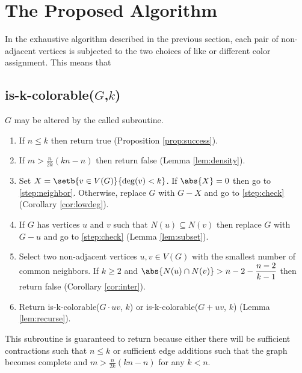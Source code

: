 \section{The Proposed Algorithm}

In the exhaustive algorithm described in the previous section, each pair of non-adjacent vertices is subjected to
the two choices of like or different color assignment.  This means that 

\subsection{is-k-colorable(\(G\),\(k\))}

\(G\) may be altered by the called subroutine.

\begin{enumerate}
\item \label{step:check} If \(n\le k\) then return true (Proposition \ref{prop:success}).

\item \label{step:density} If \(\displaystyle m>\frac{n}{2k}(kn-n)\) then return false (Lemma \ref{lem:density}).

\item \label{step:small} Set \(X=\setb{v\in V(G)}{\deg(v)<k}\).  If \(\abs{X}=0\) then go to \ref{step:neighbor}.  Otherwise,
  replace \(G\) with \(G-X\) and go to \ref{step:check} (Corollary \ref{cor:lowdeg}).

\item \label{step:neighbor} If \(G\) has vertices \(u\) and \(v\) such that \(N(u)\subseteq N(v)\) then replace \(G\) with
  \(G-u\) and go to \ref{step:check} (Lemma \ref{lem:subset}).

\item \label{step:common} Select two non-adjacent vertices \(u,v\in V(G)\) with the smallest number of common neighbors.  If
  \(k\ge2\) and \(\displaystyle\abs{N(u)\cap N(v)}>n-2-\frac{n-2}{k-1}\) then return false (Corollary \ref{cor:inter}).

\item Return is-k-colorable(\(G\cdot uv\), \(k\)) or is-k-colorable(\(G+uv\), \(k\)) (Lemma \ref{lem:recurse}).

\end{enumerate}

This subroutine is guaranteed to return because either there will be sufficient contractions such that \(n\le k\) or
sufficient edge additions such that the graph becomes complete and \(m>\frac{n}{2k}(kn-n)\) for any \(k<n\).

